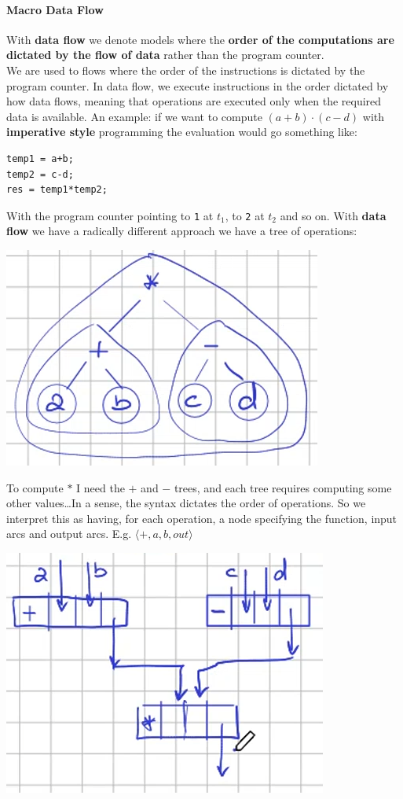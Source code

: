 \documentclass[10pt]{report}
\begin{document}
\paragraph{Macro Data Flow} With \textbf{data flow} we denote models where the \textbf{order of the computations are dictated by the flow of data} rather than the program counter.\\
We are used to flows where the order of the instructions is dictated by the program counter. In data flow, we execute instructions in the order dictated by how data flows, meaning that operations are executed only when the required data is available. An example: if we want to compute $(a+b)\cdot(c-d)$ with \textbf{imperative style} programming the evaluation would go something like: \begin{lstlisting}[style=myC]
temp1 = a+b;
temp2 = c-d;
res = temp1*temp2;
\end{lstlisting}
With the program counter pointing to \texttt{1} at $t_1$, to \texttt{2} at $t_2$ and so on. With \textbf{data flow} we have a radically different approach we have a tree of operations:
\begin{center}
	\includegraphics[scale=0.5]{28.png}
\end{center}
To compute $*$ I need the $+$ and $-$ trees, and each tree requires computing some other values\ldots In a sense, the syntax dictates the order of operations. So we interpret this as having, for each operation, a node specifying the function, input arcs and output arcs. E.g. $\langle+, a, b, out\rangle$
\begin{center}
	\includegraphics[scale=0.5]{29.png}
\end{center}
\end{document}
